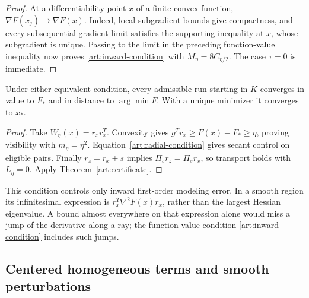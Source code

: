 \begin{proof}
At a differentiability point $x$ of a finite convex function,
$\nabla F(x_j)\to\nabla F(x)$. Indeed, local subgradient bounds give compactness,
and every subsequential gradient limit satisfies the supporting inequality
at $x$, whose subgradient is unique. Passing to the limit in the preceding
function-value inequality now proves \eqref{art:inward-condition} with
$M_\eta=8C_{\eta/2}$. The case $\tau=0$ is immediate.
\end{proof}

\begin{corollary}\label{art:radial-convergence}
Under either equivalent condition, every admissible run starting in $K$
converges in value to $F_*$ and in distance to $\arg\min F$. With a unique
minimizer it converges to $x_*$.
\end{corollary}
\begin{proof}
Take $W_\eta(x)=r_xr_x^T$. Convexity gives
$g^Tr_x\ge F(x)-F_*\ge\eta$, proving visibility with $m_\eta=\eta^2$.
Equation~\eqref{art:radial-condition} gives secant control on eligible pairs.
Finally $r_z=r_x+s$ implies $\Pi_sr_z=\Pi_sr_x$, so transport holds with
$L_\eta=0$. Apply Theorem~\ref{art:certificate}.
\end{proof}

This condition controls only inward first-order modeling error. In a smooth
region its infinitesimal expression is $r_x^T\nabla^2F(x)r_x$, rather than the
largest Hessian eigenvalue. A bound almost everywhere on that expression alone
would miss a jump of the derivative along a ray; the function-value condition
\eqref{art:inward-condition} includes such jumps.

\subsection{Centered homogeneous terms and smooth perturbations}

